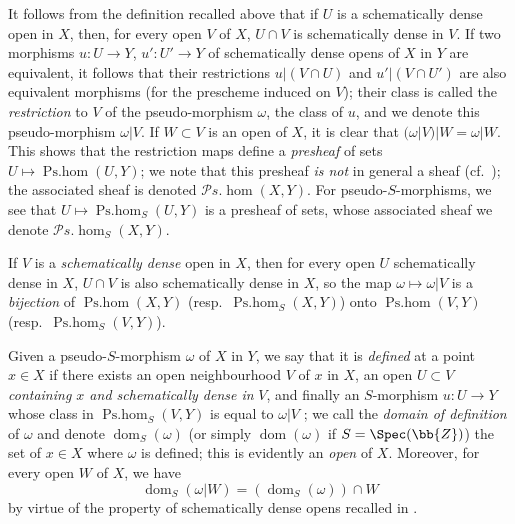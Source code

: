 \begin{env}[20.2.2]
\label{IV.20.2.2}
It follows from the definition recalled above that if $U$ is a schematically dense open in $X$, then, for every open $V$ of $X$, $U\cap V$ is schematically dense in $V$.
If two morphisms $u:U\to Y$, $u':U'\to Y$ of schematically dense opens of $X$ in $Y$ are equivalent, it follows that their restrictions $u|(V\cap U)$ and $u'|(V\cap U')$ are also equivalent morphisms (for the prescheme induced on $V$);
their class is called the \emph{restriction} to $V$ of the pseudo-morphism $\omega$, the class of $u$, and we denote this pseudo-morphism $\omega|V$.
If $W\subset V$ is an open of $X$, it is clear that $(\omega|V)|W=\omega|W$.
This shows that the restriction maps define a \emph{presheaf} of sets $U\mapsto\operatorname{Ps.hom}(U,Y)$;
we note that this presheaf \emph{is not} in general a sheaf (cf.\ );
the associated sheaf is denoted $\mathscr{P}\!s.\!\operatorname{hom}(X,Y)$.
For pseudo-$S$-morphisms, we see that $U\mapsto\operatorname{Ps.hom}_S(U,Y)$ is a presheaf of sets, whose associated sheaf we denote $\mathscr{P}\!s.\!\operatorname{hom}_S(X,Y)$.

If $V$ is a \emph{schematically dense} open in $X$, then for every open $U$ schematically dense in $X$, $U\cap V$ is also schematically dense in $X$, so the map $\omega\mapsto\omega|V$ is a \emph{bijection} of $\operatorname{Ps.hom}(X,Y)$ (resp.\ $\operatorname{Ps.hom}_S(X,Y)$) onto $\operatorname{Ps.hom}(V,Y)$ (resp.\ $\operatorname{Ps.hom}_S(V,Y)$).
\end{env}

\begin{env}[20.2.3]
\label{IV.20.2.3}
Given a pseudo-$S$-morphism $\omega$ of $X$ in $Y$, we say that it is \emph{defined} at a point $x\in X$ if there exists an open neighbourhood $V$ of $x$ in $X$, an open $U\subset V$ \emph{containing $x$ and schematically dense in} $V$, and finally an $S$-morphism $u:U\to Y$ whose class in $\operatorname{Ps.hom}_S(V,Y)$ is equal to $\omega|V$ ;
we call the \emph{domain of definition} of $\omega$ and denote $\operatorname{dom}_S(\omega)$ (or simply $\operatorname{dom}(\omega)$ if $S=\Spec(\bb{Z})$) the set of $x\in X$ where $\omega$ is defined;
this is evidently an \emph{open} of $X$.
Moreover, for every open $W$ of $X$, we have
\[
\label{IV.20.2.3.1}
  \operatorname{dom}_S(\omega|W)=(\operatorname{dom}_S(\omega))\cap W
  \tag{20.2.3.1}
\]
by virtue of the property of schematically dense opens recalled in .
\end{env}

